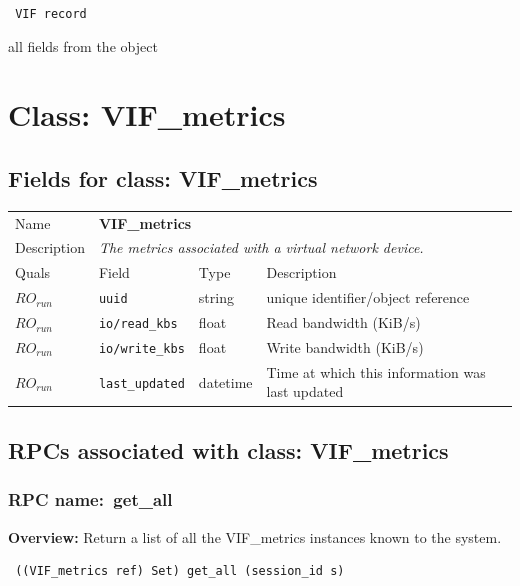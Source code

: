 \vspace{0.3cm}

{\tt 
VIF record
}


all fields from the object
\vspace{0.3cm}
\vspace{0.3cm}
\vspace{0.3cm}

\vspace{1cm}
\newpage
\section{Class: VIF\_metrics}
\subsection{Fields for class: VIF\_metrics}
\begin{longtable}{|lllp{}|}
\hline
\multicolumn{1}{|l}{Name} & \multicolumn{3}{l|}{\bf VIF\_metrics} \\
\multicolumn{1}{|l}{Description} & \multicolumn{3}{l|}{\parbox{11cm}{\em
The metrics associated with a virtual network device.}} \\
\hline
Quals & Field & Type & Description \\
\hline
$\mathit{RO}_\mathit{run}$ &  {\tt uuid} & string & unique identifier/object reference \\
$\mathit{RO}_\mathit{run}$ &  {\tt io/read\_kbs} & float & Read bandwidth (KiB/s) \\
$\mathit{RO}_\mathit{run}$ &  {\tt io/write\_kbs} & float & Write bandwidth (KiB/s) \\
$\mathit{RO}_\mathit{run}$ &  {\tt last\_updated} & datetime & Time at which this information was last updated \\
\hline
\end{longtable}
\subsection{RPCs associated with class: VIF\_metrics}
\subsubsection{RPC name:~get\_all}

{\bf Overview:} 
Return a list of all the VIF\_metrics instances known to the system.

\begin{verbatim} ((VIF_metrics ref) Set) get_all (session_id s)\end{verbatim}



